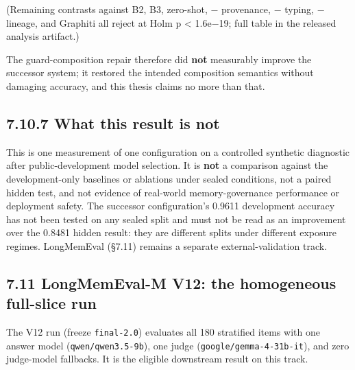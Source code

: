 (Remaining contrasts against B2, B3, zero-shot, − provenance, − typing,
− lineage, and Graphiti all reject at Holm p \textless{} 1.6e−19; full
table in the released analysis artifact.)

The guard-composition repair therefore did \textbf{not} measurably
improve the successor system; it restored the intended composition
semantics without damaging accuracy, and this thesis claims no more than
that.

\subsection{7.10.7 What this result is
not}\label{what-this-result-is-not}

This is one measurement of one configuration on a controlled synthetic
diagnostic after public-development model selection. It is \textbf{not}
a comparison against the development-only baselines or ablations under
sealed conditions, not a paired hidden test, and not evidence of
real-world memory-governance performance or deployment safety. The
successor configuration's 0.9611 development accuracy has not been
tested on any sealed split and must not be read as an improvement over
the 0.8481 hidden result: they are different splits under different
exposure regimes. LongMemEval (§7.11) remains a separate
external-validation track.

\subsection{7.11 LongMemEval-M V12: the homogeneous full-slice
run}\label{longmemeval-m-v12-the-homogeneous-full-slice-run}

The V12 run (freeze \texttt{final-2.0}) evaluates all 180 stratified
items with one answer model (\texttt{qwen/qwen3.5-9b}), one judge
(\texttt{google/gemma-4-31b-it}), and zero judge-model fallbacks. It is
the eligible downstream result on this track.

